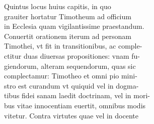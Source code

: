 \documentclass{article}
\begin{document}
\begin{pages}
                Quintus locus huius capitis, in quo \\
                grauiter hortatur Timotheum ad officium \\
                in Ecclesia quam vigilantissime praestandum. \\
                Conuertit orationem iterum ad personam \\
                Timothei, vt fit in transitionibus, ac comple- \\
                ctitur duas diuersas propositiones: vnam fu- \\
                giendorum, alteram sequendorum, quas sic \\
                complectamur: Timotheo et omni pio mini- \\
                stro est curandum vt quiquid vel in dogma- \\
                tibus fidei sanam laedit doctrinam, vel in mori- \\
                bus vitae innocentiam euertit, omnibus modis \\
                vitetur. Contra virtutes quae vel in docente \\
                

\end{pages}
\end{document}
